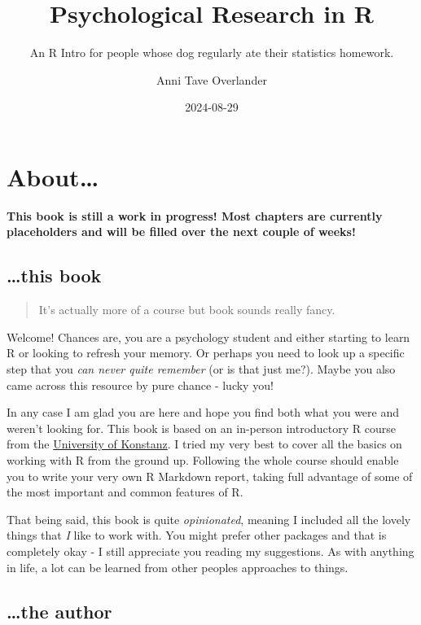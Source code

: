 \documentclass[
]{book}
\title{Psychological Research in R}
\subtitle{An R Intro for people whose dog regularly ate their statistics homework.}
\author{Anni Tave Overlander}
\date{2024-08-29}
\begin{document}
\maketitle

{
\setcounter{tocdepth}{1}
\tableofcontents
}
\chapter*{About\ldots{}}\label{about}

\textbf{This book is still a work in progress! Most chapters are currently placeholders and will be filled over the next couple of weeks!}

\section*{\ldots this book}\label{this-book}

\begin{quote}
It's actually more of a course but book sounds really fancy.
\end{quote}

Welcome!
Chances are, you are a psychology student and either starting to learn R or looking to refresh your memory.
Or perhaps you need to look up a specific step that you \emph{can never quite remember} (or is that just me?).
Maybe you also came across this resource by pure chance - lucky you!

In any case I am glad you are here and hope you find both what you were and weren't looking for.
This book is based on an in-person introductory R course from the \href{https://www.uni-konstanz.de/}{University of Konstanz}.
I tried my very best to cover all the basics on working with R from the ground up.
Following the whole course should enable you to write your very own R Markdown report, taking full advantage of some of the most important and common features of R.

That being said, this book is quite \emph{opinionated}, meaning I included all the lovely things that \emph{I} like to work with.
You might prefer other packages and that is completely okay - I still appreciate you reading my suggestions.
As with anything in life, a lot can be learned from other peoples approaches to things.

\section*{\ldots the author}\label{the-author}
\end{document}
